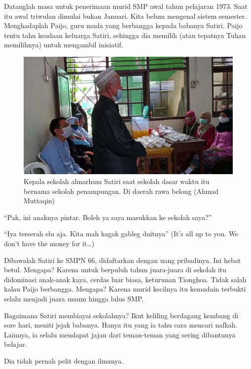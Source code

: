 Datanglah masa untuk penerimaan murid SMP awal tahun pelajaran 1973. Saat itu awal triwulan dimulai bukan Januari. Kita belum mengenal sistem semester. Menghadaplah Paijo, guru muda yang berbangga kepada babanya Satiri. Paijo tentu tahu keadaan keluarga Satiri, sehingga dia memilih (atau tepatnya Tuhan memilihnya) untuk mengambil inisiatif.

\begin{figure}[htbp]
\centerline{\includegraphics[scale=1.0]{01-03-02}}
\caption{Kepala sekolah almarhum Satiri saat sekolah dasar waktu itu bernama sekolah penampungan. Di daerah rawa belong (Ahmad Muttaqin)}
\label{01-03-02}
\end{figure}
%
“Pak, ini anaknya pintar. Boleh ya saya masukkan ke sekolah saya?”

“Iya terserah elu aja. Kita mah kagak gableg duitnya” (It’s all up to you. We don’t have the money for it…)

Dibawalah Satiri ke SMPN 66, didaftarkan dengan uang pribadinya. Ini hebat betul. Mengapa? Karena untuk berpuluh tahun juara-juara di sekolah itu didominasi anak-anak kaya, cerdas luar biasa, keturunan Tionghoa. Tidak salah kalau Paijo berbangga. Mengapa? Karena murid kecilnya itu kemudain terbukti selalu menjadi juara umum hingga lulus SMP.

Bagaimana Satiri membiayai sekolahnya? Ikut keliling berdagang kembang di sore hari, meniti jejak babanya. Hanya itu yang ia tahu cara mencari nafkah. Lainnya, ia selalu mendapat jajan dari teman-teman yang sering dibantunya belajar.

Dia tidak pernah pelit dengan ilmunya.

